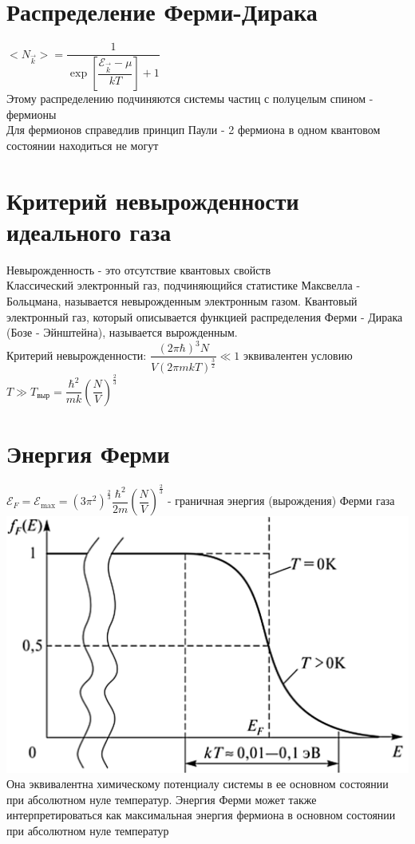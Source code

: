 \begin{multicols*}{2}
		\section{Распределение Ферми-Дирака}
		$<N_{\vec{k}}> = \dfrac{1}{\exp\left[\dfrac{\mathcal{E}_{\vec{k}} - \mu}{kT}\right] + 1}$\\
		Этому распределению подчиняются системы частиц с полуцелым спином - фермионы\\
		Для фермионов справедлив принцип Паули - 2 фермиона в одном квантовом состоянии находиться не могут\\

		\section{Критерий невырожденности идеального газа}
		Невырожденность - это отсутствие квантовых свойств\\
		Классический электронный газ, подчиняющийся статистике Максвелла - Больцмана, называется невырожденным электронным газом. Квантовый электронный газ, который описывается функцией распределения Ферми - Дирака (Бозе - Эйнштейна), называется вырожденным.\\
		Критерий невырожденности: $\dfrac{(2\pi \hbar)^3 N}{V(2\pi mkT)^{\frac{3}{2}}} \ll 1$ эквивалентен условию $T\gg T_{\text{выр}} = \dfrac{\hbar^2}{mk} \left(\dfrac{N}{V}\right)^{\frac{2}{3}}$\\

		\section{Энергия Ферми}
		${\mathcal{E}}_F = {\mathcal{E}}_{\text{max}} = \left(3 \pi^2\right)^{\frac{2}{3}} \dfrac{\hbar^2}{2m} \left(\dfrac{N}{V}\right)^{\frac{2}{3}}$ - граничная энергия (вырождения) Ферми газа\\
		\includegraphics[width=0.4\linewidth]{td_imgs/fermi.png} \\
		Она эквивалентна химическому потенциалу системы в ее основном состоянии при абсолютном нуле температур. Энергия Ферми может также интерпретироваться как максимальная энергия фермиона в основном состоянии при абсолютном нуле температур

	\end{multicols*}

